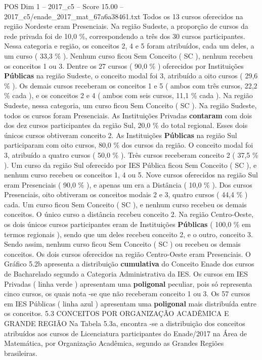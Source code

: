 \begin{textsample}{POS Dim 1 – 2017\_c5 – Score 15.00 – 2017\_c5/enade\_2017\_mat\_67a6a38461.txt}
Todos os 13 cursos oferecidos na região Nordeste eram Presenciais.
Na região Sudeste, a proporção de cursos da rede privada foi de 10,0 \%, correspondendo a três dos 30 cursos participantes.
Nessa categoria e região, os conceitos 2, 4 e 5 foram atribuídos, cada um deles, a um curso ( 33,3 \% ).
Nenhum curso ficou Sem Conceito ( SC ), nenhum recebeu os conceitos 1 ou 3.
Dentre os 27 cursos ( 90,0 \% ) oferecidos por Instituições \textbf{Públicas} na região Sudeste, o conceito modal foi 3, atribuído a oito cursos ( 29,6 \% ).
Os demais cursos receberam os conceitos 1 e 5 ( ambos com três cursos, 22,2 \% cada ), e os conceitos 2 e 4 ( ambos com seis cursos, 11,1 \% cada ).
Na região Sudeste, nessa categoria, um curso ficou Sem Conceito ( SC ).
Na região Sudeste, todos os cursos foram Presenciais.
As Instituições Privadas \textbf{contaram} com dois dos dez cursos participantes da região Sul, 20,0 \% do total regional.
Esses dois únicos cursos obtiveram conceito 2.
As Instituições \textbf{Públicas} na região Sul participaram com oito cursos, 80,0 \% dos cursos da região.
O conceito modal foi 3, atribuído a quatro cursos ( 50,0 \% ).
Três cursos receberam conceito 2 ( 37,5 \% ).
Um curso da região Sul oferecido por IES Pública ficou Sem Conceito ( SC ), e nenhum curso recebeu os conceitos 1, 4 ou 5.
Nove cursos oferecidos na região Sul eram Presenciais ( 90,0 \% ), e apenas um era a Distância ( 10,0 \% ).
Dos cursos Presenciais, oito obtiveram os conceitos modais 2 e 3, quatro cursos ( 44,4 \% ) cada.
Um curso ficou Sem Conceito ( SC ), e nenhum curso recebeu os demais conceitos.
O único curso a distância recebeu conceito 2.
Na região Centro-Oeste, os dois únicos cursos participantes eram de Instituições \textbf{Públicas} ( 100,0 \% em termos regionais ), sendo que um deles recebeu conceito 2, e o outro, conceito 3.
Sendo assim, nenhum curso ficou Sem Conceito ( SC ) ou recebeu os demais conceitos.
Os dois cursos oferecidos na região Centro-Oeste eram Presenciais.
O Gráfico 5.2b apresenta a distribuição \textbf{cumulativa} do Conceito Enade dos cursos de Bacharelado segundo a Categoria Administrativa da IES.
Os cursos em IES Privadas ( linha verde ) apresentam uma \textbf{poligonal} peculiar, pois só representa cinco cursos, os quais nota -se que não receberam conceito 1 ou 3.
Os 57 cursos em IES Públicas ( linha azul ) apresentam uma \textbf{poligonal} mais distribuída entre os conceitos. 5.3 CONCEITOS POR ORGANIZAÇÃO ACADÊMICA E GRANDE REGIÃO Na Tabela 5.3a, encontra -se a distribuição dos conceitos atribuídos aos cursos de Licenciatura participantes do Enade/2017 na Área de Matemática, por Organização Acadêmica, segundo as Grandes Regiões brasileiras.

\end{textsample}
